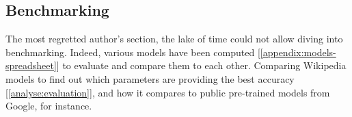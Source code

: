 \subsection{Benchmarking}
The most regretted author's section, the lake of time could not allow diving into benchmarking. Indeed, various models have been computed [\ref{appendix:models-spreadsheet}] to evaluate and compare them to each other. Comparing Wikipedia models to find out which parameters are providing the best accuracy [\ref{analyse:evaluation}], and how it compares to public pre-trained models from Google, for instance.
